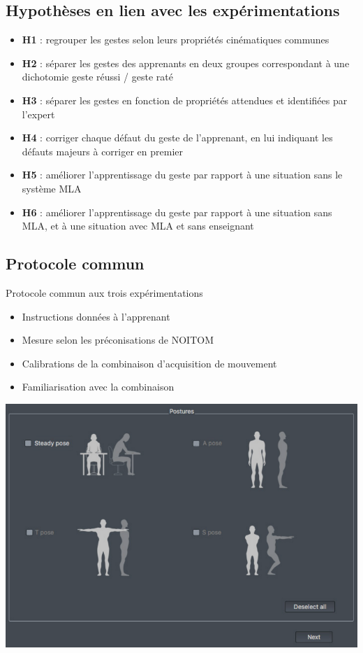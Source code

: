 \documentclass[svgnames]{beamer}
\begin{document}
	\subsection{Hypothèses en lien avec les expérimentations}
	\begin{frame}{\subsecname}
		\begin{itemize}[label=$-$]
			\item \textbf{H1} : regrouper les gestes selon leurs propriétés cinématiques communes
			\item \textbf{H2} : séparer les gestes des apprenants en deux groupes correspondant à une dichotomie geste réussi / geste raté
			\item \textbf{H3} : séparer les gestes en fonction de propriétés attendues et identifiées par l'expert
			\item \textbf{H4} : corriger chaque défaut du geste de l'apprenant, en lui indiquant les défauts majeurs à corriger en premier
			\item \textbf{H5} : améliorer l'apprentissage du geste par rapport à une situation sans le système MLA
			\item \textbf{H6} : améliorer l'apprentissage du geste par rapport à une situation sans MLA, et à une situation avec MLA et sans enseignant
		\end{itemize}
	\end{frame}

	\subsection{Protocole commun}
	\begin{frame}{Protocole commun aux trois expérimentations}
		\begin{itemize}[label=$\bullet$]
			\item Instructions données à l'apprenant
			\item Mesure selon les préconisations de NOITOM
			\item Calibrations de la combinaison d'acquisition de mouvement
			\item Familiarisation avec la combinaison 
		\end{itemize}
	
		\centering
		\includegraphics[scale=0.3]{img/percpetion_neuron_calibrations.png}
	\end{frame}
	
\end{document}
